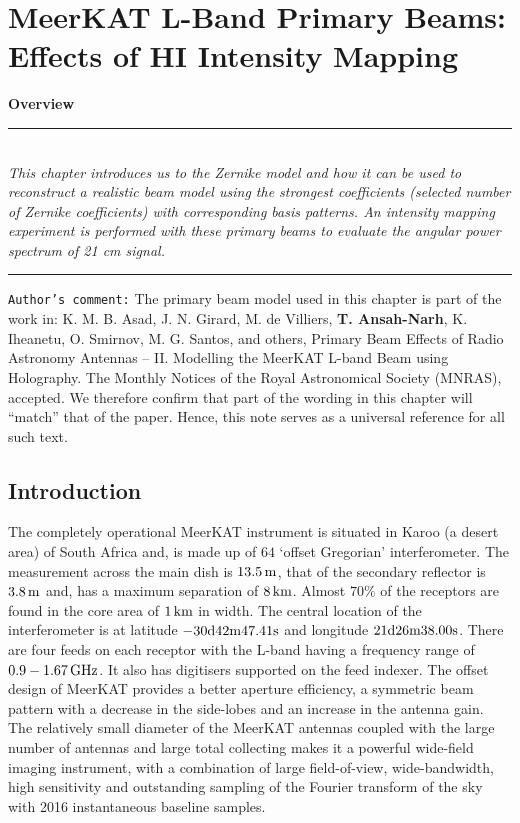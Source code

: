 \chapter{MeerKAT L-Band Primary Beams: Effects of HI Intensity Mapping} \label{Chapter5} 


\textbf{Overview}\\
\par\noindent\rule{\textwidth}{0.4pt}\\
\textit{This chapter introduces us to the Zernike model and how it can be used to reconstruct a realistic beam model using
the strongest coefficients (selected number of Zernike coefficients) with corresponding basis patterns. An intensity mapping experiment is performed with these
primary beams to evaluate the angular power spectrum of 21 cm signal.
}%
\par\noindent\rule{\textwidth}{0.4pt}

\noindent \texttt{Author’s comment:} 
\small{The primary beam model used in this chapter is part of the work in: K. M. B. Asad, J. N. Girard, M. de Villiers, \textbf{T. Ansah-Narh}, K. Iheanetu, O. Smirnov, M. G. Santos, and others, Primary Beam Effects of Radio Astronomy Antennas – II. Modelling the MeerKAT L-band Beam using Holography. The Monthly Notices of the Royal Astronomical Society (MNRAS), accepted. We therefore confirm that part of the wording in this chapter will  “match” that of the paper. Hence, this note serves as a universal reference for all such text.}

\section{Introduction}	   \label{chap5:intro}

The completely operational MeerKAT instrument is situated in Karoo (a desert area) of South Africa and, is  made up of $64$ \enquote*{offset Gregorian} interferometer. The measurement across the main dish is $13.5 \, \rm m$, that of the secondary reflector is $3.8 \, \rm m$  and, has a maximum separation of $8\, \rm km$.
Almost $70\%$ of the receptors are found in the core area of $1 \, \rm km$ in width. The central location of the interferometer is at latitude $-30\rm d42\rm m47.41\rm s$ and longitude $21\rm d26\rm m38.00\rm s$. There are four feeds on each receptor with the L-band having a frequency range of $0.9 - 1.67\, \rm GHz$.
It also has digitisers supported on the feed indexer. The offset design of MeerKAT provides a better aperture efficiency, a symmetric beam pattern with a decrease in the side-lobes and an increase in the antenna gain. 
The relatively small diameter of the MeerKAT antennas coupled with the large number of antennas and large total collecting makes it a powerful wide-field imaging instrument, with a combination of large field-of-view, wide-bandwidth, high sensitivity and outstanding sampling of the Fourier transform of the sky with 2016 instantaneous baseline samples.

